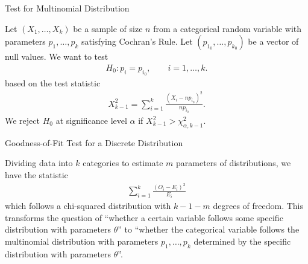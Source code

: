\begin{frame}{Test for Multinomial Distribution}

\justifying
{} Let $(X_1, \ldots, X_k)$ be a sample of size $n$ from a categorical random variable with parameters $p_1, \ldots, p_k$ satisfying Cochran's Rule. Let $(p_{1_0}, \ldots, p_{k_0})$ be a vector of null values. We want to test
\begin{align*}
H_0: p_i = p_{i_0}, \qquad i = 1,\ldots, k.
\end{align*}
based on the test statistic
\begin{align*}
X_{k-1}^2 = \sum_{i=1}^k \frac{(X_i - np_{i_0})^2}{np_{i_0}}.
\end{align*}
We reject $H_0$ at significance level $\alpha$ if $X_{k-1}^2 > \chi_{\alpha,k-1}^2$.

\end{frame}


\begin{frame}{Goodness-of-Fit Test for a Discrete Distribution}

\justifying
{} Dividing data into $k$ categories to estimate $m$ parameters of distributions, we have the statistic
\begin{align*}
\sum_{i=1}^k \frac{(O_i - E_i)^2}{E_i}
\end{align*}
which follows a chi-squared distribution with $k-1-m$ degrees of freedom. This transforms the question of ``whether a certain variable follows some specific distribution with parameters $\theta$'' to ``whether the categorical variable follows the multinomial distribution with parameters $p_1,\ldots, p_k$ determined by the specific distribution with parameters $\theta$''.

\end{frame}

